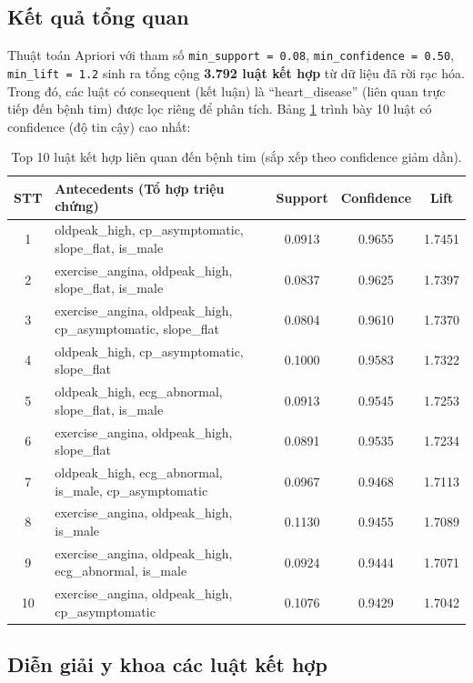 \subsection{Kết quả tổng quan}

Thuật toán Apriori với tham số \texttt{min\_support = 0.08}, \texttt{min\_confidence = 0.50}, \texttt{min\_lift = 1.2} sinh ra tổng cộng \textbf{3.792 luật kết hợp} từ dữ liệu đã rời rạc hóa. Trong đó, các luật có consequent (kết luận) là ``heart\_disease'' (liên quan trực tiếp đến bệnh tim) được lọc riêng để phân tích. Bảng \ref{tab:top_rules} trình bày 10 luật có confidence (độ tin cậy) cao nhất:

\begin{table}[H]
\centering
\caption{Top 10 luật kết hợp liên quan đến bệnh tim (sắp xếp theo confidence giảm dần).}
\label{tab:top_rules}
\small
\begin{tabular}{|c|p{6cm}|c|c|c|}
\hline
\textbf{STT} & \textbf{Antecedents (Tổ hợp triệu chứng)} & \textbf{Support} & \textbf{Confidence} & \textbf{Lift} \\ \hline
1 & oldpeak\_high, cp\_asymptomatic, slope\_flat, is\_male & 0.0913 & 0.9655 & 1.7451 \\ \hline
2 & exercise\_angina, oldpeak\_high, slope\_flat, is\_male & 0.0837 & 0.9625 & 1.7397 \\ \hline
3 & exercise\_angina, oldpeak\_high, cp\_asymptomatic, slope\_flat & 0.0804 & 0.9610 & 1.7370 \\ \hline
4 & oldpeak\_high, cp\_asymptomatic, slope\_flat & 0.1000 & 0.9583 & 1.7322 \\ \hline
5 & oldpeak\_high, ecg\_abnormal, slope\_flat, is\_male & 0.0913 & 0.9545 & 1.7253 \\ \hline
6 & exercise\_angina, oldpeak\_high, slope\_flat & 0.0891 & 0.9535 & 1.7234 \\ \hline
7 & oldpeak\_high, ecg\_abnormal, is\_male, cp\_asymptomatic & 0.0967 & 0.9468 & 1.7113 \\ \hline
8 & exercise\_angina, oldpeak\_high, is\_male & 0.1130 & 0.9455 & 1.7089 \\ \hline
9 & exercise\_angina, oldpeak\_high, ecg\_abnormal, is\_male & 0.0924 & 0.9444 & 1.7071 \\ \hline
10 & exercise\_angina, oldpeak\_high, cp\_asymptomatic & 0.1076 & 0.9429 & 1.7042 \\ \hline
\end{tabular}
\end{table}

\subsection{Diễn giải y khoa các luật kết hợp}

